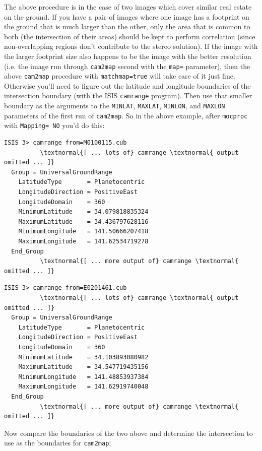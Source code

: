 The above procedure is in the case of two images which cover similar
real estate on the ground.  If you have a pair of images where one
image has a footprint on the ground that is much larger than the
other, only the area that is common to both (the intersection of their
areas) should be kept to perform correlation (since non-overlapping
regions don't contribute to the stereo solution).  If the image with
the larger footprint size also happens to be the image with the better
resolution (i.e. the image run through \texttt{cam2map} second with
the \texttt{map=} parameter), then the above \texttt{cam2map}
procedure with \texttt{matchmap=true} will take care of it just fine.
Otherwise you'll need to figure out the latitude and longitude
boundaries of the intersection boundary (with the \ac{ISIS}
\texttt{camrange} program).  Then use that smaller boundary as the
arguments to the \texttt{MINLAT}, \texttt{MAXLAT}, \texttt{MINLON},
and \texttt{MAXLON} parameters of the first run of \texttt{cam2map}.
So in the above example, after \texttt{mocproc} with \texttt{Mapping=
  NO} you'd do this:

\begin{Verbatim}[commandchars=\\\{\}]
  ISIS 3> camrange from=M0100115.cub
          \textnormal{[ ... lots of} camrange \textnormal{ output omitted ... ]}
  Group = UniversalGroundRange
    LatitudeType       = Planetocentric
    LongitudeDirection = PositiveEast
    LongitudeDomain    = 360
    MinimumLatitude    = 34.079818835324
    MaximumLatitude    = 34.436797628116
    MinimumLongitude   = 141.50666207418
    MaximumLongitude   = 141.62534719278
  End_Group
          \textnormal{[ ... more output of} camrange \textnormal{ omitted ... ]}
\end{Verbatim}

\begin{Verbatim}[commandchars=\\\{\}]
  ISIS 3> camrange from=E0201461.cub
          \textnormal{[ ... lots of} camrange \textnormal{ output omitted ... ]}
  Group = UniversalGroundRange
    LatitudeType       = Planetocentric
    LongitudeDirection = PositiveEast
    LongitudeDomain    = 360
    MinimumLatitude    = 34.103893080982
    MaximumLatitude    = 34.547719435156
    MinimumLongitude   = 141.48853937384
    MaximumLongitude   = 141.62919740048
  End_Group
          \textnormal{[ ... more output of} camrange \textnormal{ omitted ... ]}
\end{Verbatim}

Now compare the boundaries of the two above and determine the intersection to use as the boundaries for \texttt{cam2map}:

